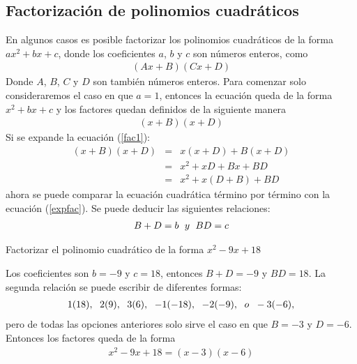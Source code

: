\subsection{Factorización de polinomios cuadráticos}
\label{factor0}
En algunos casos es posible factorizar los polinomios cuadráticos de la forma $ax^{2}+bx+c$, donde los coeficientes $a$, $b$ y $c$ son números enteros, como 
\begin{eqnarray}
(Ax+B)(Cx+D) \label{fac0}
\end{eqnarray}
Donde $A$, $B$, $C$ y $D$ son también números enteros. Para comenzar solo consideraremos el caso en que $a=1$, entonces la ecuación queda de la forma $x^{2}+bx+c$ y los factores quedan definidos de la siguiente manera\\
\begin{eqnarray}
(x+B)(x+D) \label{fac1}
\end{eqnarray}
Si se expande la ecuación (\ref{fac1}):\\
\begin{eqnarray}
(x+B)(x+D)&=& x(x+D)+B(x+D)\nonumber\\
&=&x^{2}+xD+Bx+BD \nonumber\\
&=&x^{2}+x(D+B)+BD \label{expfac}
\end{eqnarray}
ahora se puede comparar la ecuación cuadrática término por término con la ecuación (\ref{expfac}). Se puede deducir las siguientes relaciones:
\begin{eqnarray*}
B+D=b \hspace{6px}y \hspace{6px}BD=c 
\end{eqnarray*}
\begin{myexample}
Factorizar el polinomio cuadrático de la forma $x^{2}-9x+18$
\end{myexample}
Los coeficientes son $b=-9$ y $c=18$, entonces $B+D=-9$ y $BD=18$. La segunda relación se puede escribir de diferentes formas:
\begin{eqnarray*}
1(18),\hspace{6px}2(9),\hspace{6px}3(6),\hspace{6px}-1(-18),\hspace{6px}-2(-9),\hspace{6px}o \hspace{6px}-3(-6),
\end{eqnarray*}
pero de todas las opciones anteriores solo sirve el caso en que  $B=-3$ y $D=-6$. Entonces los factores queda de la forma 
\begin{eqnarray*}
x^{2}-9x+18=(x-3)(x-6)
\end{eqnarray*}

